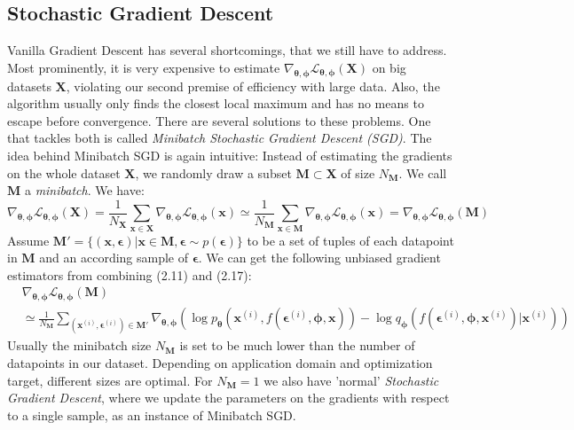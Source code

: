 \documentclass[12pt]{report}
\theoremstyle{definition}
\begin{document}
\subsection{Stochastic Gradient Descent}
Vanilla Gradient Descent has several shortcomings, that we still have to address. Most prominently, it is very expensive to estimate $\nabla_{\pmb{\theta}, \pmb{\phi}}\mathcal{L}_{\pmb{\theta}, \pmb{\phi}}(\mathbf{X})$ on big datasets $\mathbf{X}$, violating our second premise of efficiency with large data. Also, the algorithm usually only finds the closest local maximum and has no means to escape before convergence. There are several solutions to these problems. One that tackles both is called \emph{Minibatch Stochastic Gradient Descent (SGD)}.
The idea behind Minibatch SGD is again intuitive: Instead of estimating the gradients on the whole dataset $\mathbf{X}$, we randomly draw a subset $\mathbf{M} \subset \mathbf{X}$ of size $N_{\mathbf{M}}$. We call $\mathbf{M}$ a \emph{minibatch}. We have:
\begin{equation}
\nabla_{\pmb{\theta}, \pmb{\phi}}\mathcal{L}_{\pmb{\theta}, \pmb{\phi}}(\mathbf{X})
= \frac{1}{N_{\mathbf{X}}} \sum_{\mathbf{x} \in \mathbf{X}} \nabla_{\pmb{\theta}, \pmb{\phi}} \mathcal{L}_{\pmb{\theta}, \pmb{\phi}}(\mathbf{x})
\simeq \frac{1}{N_{\mathbf{M}}} \sum_{\mathbf{x} \in \mathbf{M}} \nabla_{\pmb{\theta}, \pmb{\phi}} \mathcal{L}_{\pmb{\theta}, \pmb{\phi}}(\mathbf{x})
= \nabla_{\pmb{\theta}, \pmb{\phi}}\mathcal{L}_{\pmb{\theta}, \pmb{\phi}}(\mathbf{M})
\end{equation}
Assume $\mathbf{M}'=\{(\mathbf{x}, \pmb{\epsilon}) |  \mathbf{x} \in \mathbf{M}, \pmb{\epsilon} \sim p(\pmb{\epsilon})\}$ to be a set of tuples of each datapoint in $\mathbf{M}$ and an according sample of $\pmb{\epsilon}$. We can get the following unbiased gradient estimators from combining (2.11) and (2.17):
\begin{equation}
\begin{split}
& \nabla_{\pmb{\theta}, \pmb{\phi}}\mathcal{L}_{\pmb{\theta}, \pmb{\phi}}(\mathbf{M}) \\
&	\simeq \frac{1}{N_{\mathbf{M}}} \sum_{(\mathbf{x}^{(i)}, \pmb{\epsilon}^{(i)}) \in \mathbf{M}'} \nabla_{\pmb{\theta}, \pmb{\phi}}(\log p_{\pmb{\theta}}(\mathbf{x}^{(i)}, f(\pmb{\epsilon}^{(i)}, \pmb{\phi}, \mathbf{x})) - \log q_{\pmb{\phi}}(f(\pmb{\epsilon}^{(i)}, \pmb{\phi}, \mathbf{x}^{(i)})|\mathbf{x}^{(i)}))
\end{split}
\end{equation}
Usually the minibatch size $N_{\mathbf{M}}$ is set to be much lower than the number of datapoints in our dataset. Depending on application domain and optimization target, different sizes are optimal. For $N_\mathbf{M}=1$ we also have 'normal' \emph{Stochastic Gradient Descent}, where we update the parameters on the gradients with respect to a single sample, as an instance of Minibatch SGD. 
\end{document}
